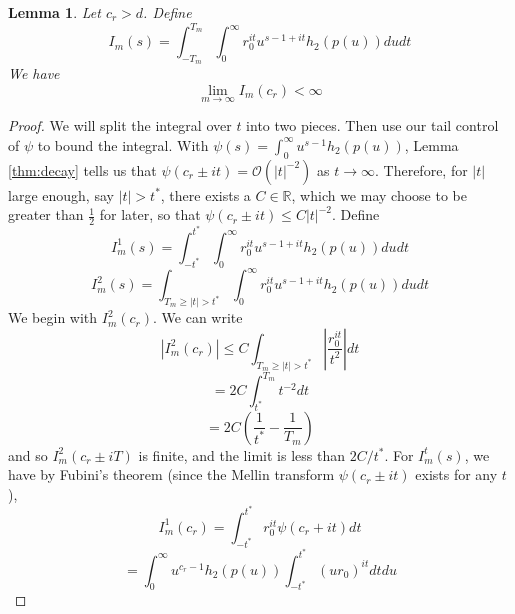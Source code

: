 \documentclass[10pt,a4paper]{amsart}
\newtheorem{lemma}{Lemma}
\newcommand{\bigO}[1]{\mathcal{O}\left(#1\right)}
\newcommand{\tti}{\rightarrow\infty}
\begin{document}
\begin{lemma}
    \label{thm:final_finiite_bound}
    Let $c_r > d$. Define
    \begin{equation}
        I_m(s) = \int_{-T_m}^{T_m}\int_0^\infty r_0^{it}u^{s-1+it}h_2(p(u))dudt
    \end{equation}
    We have
    \begin{equation}
        \lim_{m\tti} I_m(c_r) < \infty
    \end{equation}
\end{lemma}

\begin{proof}
    We will split the integral over $t$ into two pieces. Then use our tail control of $\psi$ to bound the integral. With $\psi(s)=\int_0^\infty u^{s-1}h_2(p(u))$, Lemma \ref{thm:decay} tells us that $\psi(c_r\pm it) = \bigO{|t|^{-2}}$ as $t\tti$. Therefore, for $|t|$ large enough, say $|t| > t^*$, 
    there exists a $C \in \mathbb{R}$, which we may choose to be greater than $\frac{1}{2}$ for later, so that $\psi(c_r\pm it) \leq C|t|^{-2}$.
    Define
    \begin{equation}
        I_m^1(s) = \int_{-t^*}^{t^*}\int_0^\infty r_0^{it}u^{s-1+it}h_2(p(u))dudt
    \end{equation}
    \begin{equation}
        I_m^2(s)=\int_{T_m \geq |t|>t^*}\int_0^\infty r_0^{it}u^{s-1+it}h_2(p(u))dudt
    \end{equation}
    We begin with $I_m^2(c_r)$. We can write
    \begin{equation}
        |I_m^2(c_r)| \leq C\int_{T_m \geq |t|>t^*} \left|\frac{r_0^{it}}{t^2}\right|dt
    \end{equation}
    \begin{equation}
     = 2C\int_{t^*}^{T_m}t^{-2}dt
    \end{equation}
    \begin{equation}
        = 2C\left(\frac{1}{t^*}-\frac{1}{T_m}\right) 
    \end{equation}
    and so $I_m^2(c_r\pm iT)$ is finite, and the limit is less than $2C/t^*$. For $I_m^t(s)$, we have by Fubini's theorem (since the Mellin transform $\psi(c_r\pm it)$ exists for any $t$), 
    \begin{equation}
        I_m^1(c_r) = \int_{-t^*}^{t^*}r_0^{it}\psi(c_r+it)dt
    \end{equation}
    \begin{equation}
        = \int_0^{\infty} u^{c_r-1}h_2(p(u))\int_{-t^*}^{t^*} (ur_0)^{it}dtdu
    \end{equation}

\end{proof}
\end{document}
